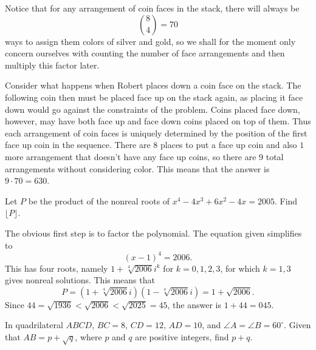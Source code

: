\documentclass[a4paper, 12pt]{article}
\begin{document}
\begin{solution}
    Notice that for any arrangement of coin faces in the stack, there will always be
    \[
        \binom{8}{4} = 70
    \]
    ways to assign them colors of silver and gold, so we shall for the moment only concern ourselves with counting the number of face arrangements and then multiply this factor later.

    Consider what happens when Robert places down a coin face on the stack. The following coin then must be placed face up on the stack again, as placing it face down would go against the constraints of the problem. Coins placed face down, however, may have both face up and face down coins placed on top of them. Thus each arrangement of coin faces is uniquely determined by the position of the first face up coin in the sequence. There are \( 8 \) places to put a face up coin and also \( 1 \) more arrangement that doesn't have any face up coins, so there are \( 9 \) total arrangements without considering color. This means that the answer is \( 9 \cdot 70 = 630 \).
\end{solution}

\begin{chirpbox}
    \begin{problemnum}
        Let \( P \) be the product of the nonreal roots of \( x^4 - 4x^3 + 6x^2 - 4x = 2005 \). Find \( \lfloor P \rfloor \).
    \end{problemnum}
\end{chirpbox}

\begin{solution}
    The obvious first step is to factor the polynomial. The equation given simplifies to
    \[
        (x-1)^4 = 2006
    .\]
    This has four roots, namely \(1 +  \sqrt[4]{2006} i^k \) for \( k = 0, 1, 2, 3 \), for which \( k = 1, 3 \) gives nonreal solutions. This means that
    \[
        P = \left( 1 + \sqrt[4]{2006}i \right) \left( 1 - \sqrt[4]{2006}i \right) = 1 + \sqrt{2006}
    .\]
    Since \( 44 = \sqrt{1936} < \sqrt{2006} < \sqrt{2025} = 45 \), the answer is \( 1 + 44 = \boxed{045} \).
\end{solution}

\begin{chirpbox}
    \begin{problemnum}
        In quadrilateral \( ABCD \), \( BC = 8 \), \( CD = 12 \), \( AD = 10 \), and \( \angle A = \angle B = 60^\circ \). Given that \( AB = p + \sqrt{q} \), where \( p \) and \( q \) are positive integers, find \( p + q \).
    \end{problemnum}
\end{chirpbox}
\end{document}
